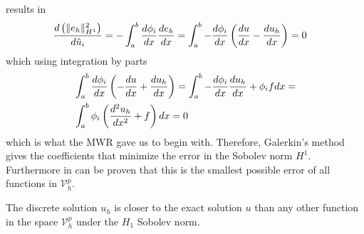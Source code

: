 results in 
\begin{equation}
\begin{split}
& \frac{ d\left(  \Vert e_{h} \Vert_{H^{1}}^{2}  \right) } {d \hat{u}_{i}} = - \int_{a}^{b} \frac{d \phi_{i}}{dx} \frac{d e_{h}}{dx} = \int_{a}^{b}  -\frac{d \phi_{i}}{dx} \left( \frac{du}{dx} - \frac{d u_{h}}{dx} \right)  = 0
\end{split}
\end{equation}
which using integration by parts 
\begin{equation}
\begin{split}
& \int_{a}^{b} \frac{d \phi_{i}}{dx} \left( -\frac{d u}{dx} + \frac{d u_{h}}{dx} \right) = \int_{a}^{b} -\frac{d \phi_{i}}{dx} \frac{d u_{h}}{dx} + \phi_{i} f dx =  \\
 & \int_{a}^{b} \phi_{i}\left(  \frac{ d^{2} u_{h}}{dx^{2}} + f \right)dx  = 0 
 \end{split}
\end{equation}
which is what the MWR gave us to begin with.  Therefore, Galerkin's method gives the coefficients that minimize the error in the Sobolev norm $H^{1}$.  Furthermore in can be proven that this is the smallest possible error of all functions in $\mathcal{V}_{h}^{p}$.
\begin{prop}
The discrete solution $u_{h}$ is closer  to the exact solution $u$ than any other function in the space $\mathcal{V}_{h}^{p}$ under the $H_{1}$ Sobolev norm. 
\end{prop}
